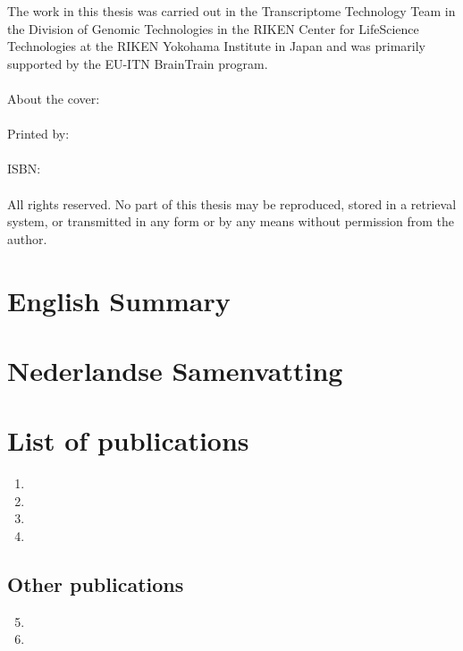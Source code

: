 \documentclass[10pt,a4paper]{report}
\begin{document}
\newpage

\normalsize
{
   \setlength{\parindent}{0cm}
   The work in this thesis was carried out in the Transcriptome Technology Team in the Division of Genomic Technologies in the RIKEN Center for LifeScience Technologies at the RIKEN Yokohama Institute in Japan and was primarily supported by the EU-ITN BrainTrain program.
   \\
   \\
   About the cover:
   \\
   \\
   Printed by:
   \\
   \\
   ISBN:
   \\
   \\
   All rights reserved. No part of this thesis may be reproduced, stored in a retrieval system, or transmitted in any form or by any means without permission from the author.
}

\chapter*{English Summary}
\small


\chapter*{Nederlandse Samenvatting}

\normalsize

\chapter*{List of publications}

\begin{enumerate}
   \item {}
   \item {}
   \item {}
   \item {}
\end{enumerate}

\section*{Other publications}

\begin{enumerate}
   \setcounter{enumi}{4}
   \item {}
   \item {}
\end{enumerate}
\end{document}
